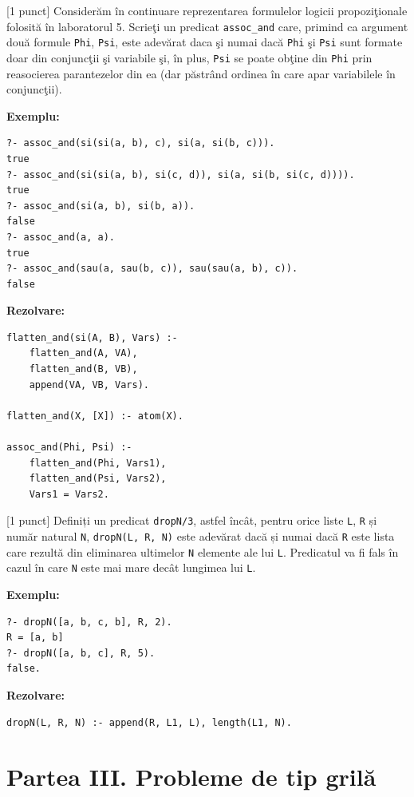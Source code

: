 \documentclass[12pt]{article}
\newcommand{\probex}{\stepcounter{uebno}{\vspace{0.3cm}\noindent \bf (P\arabic{uebno}) }}
\begin{document}
\probex[1 punct]
Consider\u{a}m \^{i}n continuare reprezentarea formulelor logicii propozi\c{t}ionale folosit\u{a} 
    \^{i}n laboratorul 5.
   Scrie\c{t}i un predicat \texttt{assoc\_and} care, 
    primind ca argument dou\u{a} formule \texttt{Phi}, \texttt{Psi}, 
    este adev\u{a}rat 
    daca \c{s}i numai dac\u{a} 
    \texttt{Phi} \c{s}i \texttt{Psi} sunt formate doar din conjunc\c{t}ii \c{s}i variabile
    \c{s}i, \^{i}n plus,
    \texttt{Psi} se poate ob\c{t}ine din \texttt{Phi}
    prin reasocierea parantezelor din ea (dar p\u{a}str\^{a}nd ordinea \^{i}n care apar variabilele \^{i}n conjunc\c{t}ii). 

    \textbf{Exemplu:}
\begin{verbatim}
?- assoc_and(si(si(a, b), c), si(a, si(b, c))). 
true 
?- assoc_and(si(si(a, b), si(c, d)), si(a, si(b, si(c, d)))).
true 
?- assoc_and(si(a, b), si(b, a)).
false 
?- assoc_and(a, a).
true 
?- assoc_and(sau(a, sau(b, c)), sau(sau(a, b), c)).
false 
\end{verbatim}
\textbf{Rezolvare:}
\begin{verbatim}
flatten_and(si(A, B), Vars) :-
    flatten_and(A, VA),
    flatten_and(B, VB),
    append(VA, VB, Vars).

flatten_and(X, [X]) :- atom(X).

assoc_and(Phi, Psi) :-
    flatten_and(Phi, Vars1),
    flatten_and(Psi, Vars2),
    Vars1 = Vars2.
\end{verbatim}

\probex[1 punct]
Definiți un predicat \texttt{dropN/3}, astfel încât, pentru orice liste \texttt{L}, \texttt{R} și număr natural \texttt{N},
\texttt{dropN(L, R, N)} este adevărat dacă și numai dacă \texttt{R} este lista care rezultă din eliminarea ultimelor
\texttt{N} elemente ale lui \texttt{L}. Predicatul va fi fals în cazul în care \texttt{N} este mai mare decât lungimea lui \texttt{L}.

\textbf{Exemplu:}
\begin{verbatim}
?- dropN([a, b, c, b], R, 2).
R = [a, b]
?- dropN([a, b, c], R, 5).
false.
\end{verbatim}

\textbf{Rezolvare:}
\begin{verbatim}
dropN(L, R, N) :- append(R, L1, L), length(L1, N).
\end{verbatim}


\section*{Partea III. Probleme de tip gril\u a}
\end{document}
